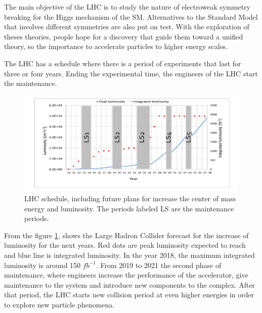 The main objective of the LHC is to study the nature of electroweak symmetry breaking for the Higgs mechanism of the SM. 
Alternatives to the Standard Model that involves different symmetries are also put on test. With the exploration of theses theories, people hope for a discovery that guide them toward a unified theory, so the importance to accelerate particles to higher energy scales.

The LHC has a schedule where there is a period of experiments that last for three or four years. Ending the experimental time, the engineers of the LHC start the maintenance.

\begin{figure}[ht]
\centering
\includegraphics[scale=0.5]{Chapter2/lum6.png}
\caption[LHC schedule, including future plans for increase the center of mass energy and luminosity. The periods labeled LS are the maintenance periods]{LHC schedule, including future plans for increase the center of mass energy and luminosity. The periods labeled LS are the maintenance periods\cite{cern3}.}
\label{lhc-lumi}
\end{figure}
From the figure \ref{lhc-lumi}, shows the Large Hadron Collider forecast for the increase of luminosity for the next years. Red dots are peak luminosity expected to reach and blue line is integrated luminosity. In the year 2018, the maximum integrated luminosity is around 150 $fb^{-1}$\cite{cern3}. From 2019 to 2021 the second phase of maintenance, where engineers increase the performance of the accelerator, give maintenance to the system and introduce new components to the complex. After that period, the LHC starts new collision period at even higher energies in order to explore new particle phenomena.

\pagebreak


